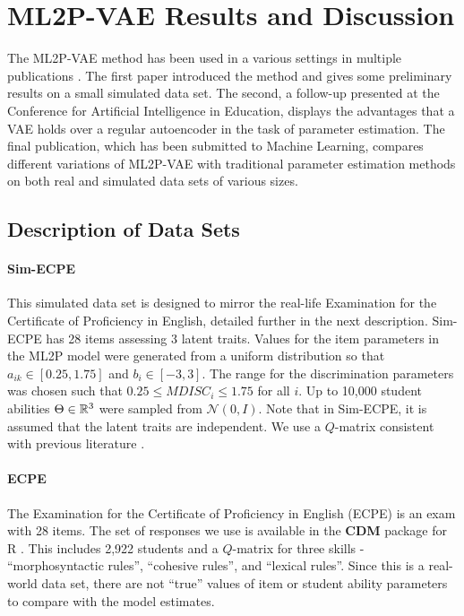 \chapter{ML2P-VAE Results and Discussion}

The ML2P-VAE method has been used in a various settings in multiple publications \cite{ijcnn_paper, aied_paper, ml_paper}. The first paper introduced the method and gives some preliminary results on a small simulated data set. The second, a follow-up presented at the Conference for Artificial Intelligence in Education, displays the advantages that a VAE holds over a regular autoencoder in the task of parameter estimation. The final publication, which has been submitted to Machine Learning, compares different variations of ML2P-VAE with traditional parameter estimation methods on both real and simulated data sets of various sizes.

\section{Description of Data Sets}\label{sec:irt_data}
\subsubsection*{Sim-ECPE} This simulated data set is designed to mirror the real-life Examination for the Certificate of Proficiency in English, detailed further in the next description. Sim-ECPE has 28 items assessing 3 latent traits. Values for the item parameters in the ML2P model were generated from a uniform distribution so that $a_{ik} \in [0.25, 1.75]$ and $b_i \in [-3,3]$. The range for the discrimination parameters was chosen such that $0.25 \leq MDISC_i \leq 1.75$  for all $i$. Up to 10,000 student abilities $\Theta \in \mathbb{R}^3$ were sampled from $\mathcal{N}(0,I)$. Note that in Sim-ECPE, it is assumed that the latent traits are independent. We use a $Q$-matrix consistent with previous literature \cite{daSilva2018, Templin2013, henson2007}.

\subsubsection*{ECPE} The Examination for the Certificate of Proficiency in English (ECPE) is an exam with 28 items. The set of responses we use is available in the \textbf{CDM} package for R \cite{cdm}. This includes 2,922 students and a $Q$-matrix for three skills - ``morphosyntactic rules'', ``cohesive rules'', and ``lexical rules''. Since this is a real-world data set, there are not ``true'' values of item or student ability parameters to compare with the model estimates.

